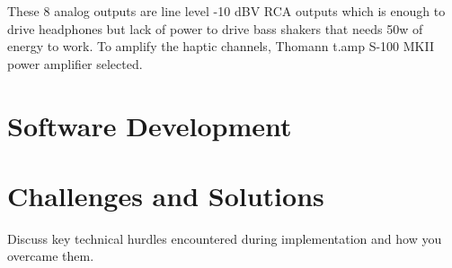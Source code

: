         These 8 analog outputs are line level -10 dBV RCA outputs which is enough to drive headphones but lack of power to drive bass shakers that needs 50w of energy to work. To amplify the haptic channels, Thomann t.amp S-100 MKII power amplifier selected.\par
    \section{Software Development}
    \section{Challenges and Solutions} Discuss key technical hurdles encountered during implementation and how you overcame them.